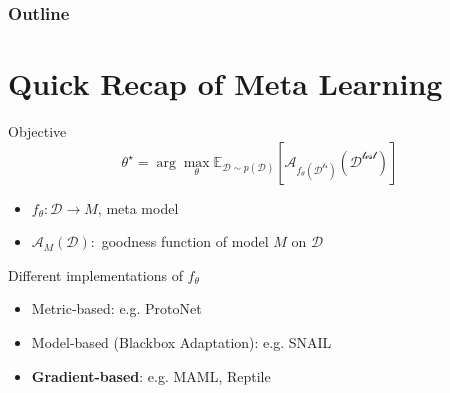 \documentclass{beamer}
\begin{document}
\begin{frame}
\frametitle{Outline}
\tableofcontents
\end{frame}

\section{Quick Recap of Meta Learning}
\begin{frame}{Objective}
      \begin{equation*}
        \theta^{\star} = \arg \max_\theta \mathbb{E}_{\mathcal{D} \sim p(\mathcal{D}) }[\mathcal{A}_{f_\theta(\mathcal{D^{\text{tr}}})}(\mathcal{D^{\text{test}}})]
      \end{equation*}

      \begin{itemize}
        \item $f_\theta: \mathcal{D} \rightarrow M$, meta model
        \item $\mathcal{A}_M(\mathcal{D}): $ goodness function of model $M$ on $\mathcal{D}$
      \end{itemize}
\end{frame}

\begin{frame}[t]{Different implementations of $f_\theta$}
  \begin{itemize}
    \item Metric-based: e.g. ProtoNet
    \item Model-based (Blackbox Adaptation): e.g. SNAIL
    \item \textbf{Gradient-based}: e.g. MAML, Reptile
  \end{itemize}
\end{frame}
\end{document}
